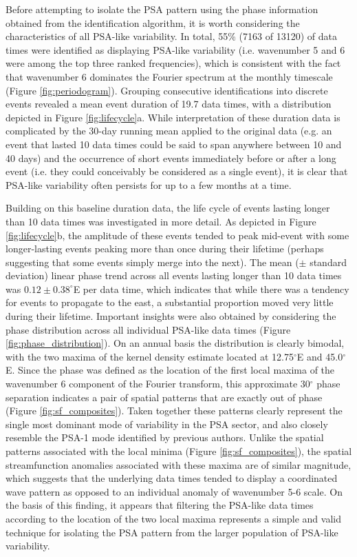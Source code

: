 Before attempting to isolate the PSA pattern using the phase information obtained from the identification algorithm, it is worth considering the characteristics of all PSA-like variability. In total, 55\% (7163 of 13120) of data times were identified as displaying PSA-like variability (i.e. wavenumber 5 and 6 were among the top three ranked frequencies), which is consistent with the fact that wavenumber 6 dominates the Fourier spectrum at the monthly timescale (Figure \ref{fig:periodogram}). Grouping consecutive identifications into discrete events revealed a mean event duration of 19.7 data times, with a distribution depicted in Figure \ref{fig:lifecycle}a. While interpretation of these duration data is complicated by the 30-day running mean applied to the original data (e.g. an event that lasted 10 data times could be said to span anywhere between 10 and 40 days) and the occurrence of short events immediately before or after a long event (i.e. they could conceivably be considered as a single event), it is clear that PSA-like variability often persists for up to a few months at a time.     

Building on this baseline duration data, the life cycle of events lasting longer than 10 data times was investigated in more detail. As depicted in Figure \ref{fig:lifecycle}b, the amplitude of these events tended to peak mid-event with some longer-lasting events peaking more than once during their lifetime (perhaps suggesting that some events simply merge into the next). The mean ($\pm$ standard deviation) linear phase trend across all events lasting longer than 10 data times was $0.12 \pm 0.38^{\circ}$E per data time, which indicates that while there was a tendency for events to propagate to the east, a substantial proportion moved very little during their lifetime. Important insights were also obtained by considering the phase distribution across all individual PSA-like data times (Figure \ref{fig:phase_distribution}). On an annual basis the distribution is clearly bimodal, with the two maxima of the kernel density estimate located at 12.75$^{\circ}$E and 45.0$^{\circ}$E. Since the phase was defined as the location of the first local maxima of the wavenumber 6 component of the Fourier transform, this approximate 30$^{\circ}$ phase separation indicates a pair of spatial patterns that are exactly out of phase (Figure \ref{fig:sf_composites}). Taken together these patterns clearly represent the single most dominant mode of variability in the PSA sector, and also closely resemble the PSA-1 mode identified by previous authors. Unlike the spatial patterns associated with the local minima (Figure \ref{fig:sf_composites}), the spatial streamfunction anomalies associated with these maxima are of similar magnitude, which suggests that the underlying data times tended to display a coordinated wave pattern as opposed to an individual anomaly of wavenumber 5-6 scale. On the basis of this finding, it appears that filtering the PSA-like data times according to the location of the two local maxima represents a simple and valid technique for isolating the PSA pattern from the larger population of PSA-like variability. 

